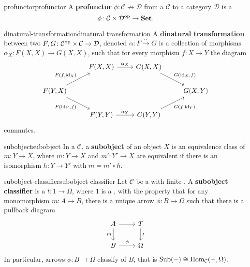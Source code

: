 \begin{topic}{profunctor}{profunctor}
    A \textbf{profunctor} $\phi : \mathcal{C} \nrightarrow \mathcal{D}$ from a  $\mathcal{C}$ to a category $\mathcal{D}$ is a 
    \[ \phi \colon \mathcal{C} \times \mathcal{D}^\textup{op} \to \textbf{Set} . \]
\end{topic}

\begin{topic}{dinatural-transformation}{dinatural transformation}
    A \textbf{dinatural transformation} between two  $F, G \colon \mathcal{C}^\textup{op} \times \mathcal{C} \to \mathcal{D}$, denoted $\alpha \colon F \xrightarrow{\cdot\cdot} G$ is a collection of morphisms $\alpha_X \colon F(X, X) \to G(X, X)$, such that for every morphism $f \colon X \to Y$ the diagram
    \[ \svg \begin{tikzcd} & F(X, X) \arrow{r}{\alpha_X} & G(X, X) \arrow{dr}{G(\id_X, f)} & \\ F(Y, X) \arrow{ur}{F(f, \id_X)} \arrow[swap]{dr}{F(\id_Y, f)} & & & G(X, Y) \\ & F(Y, Y) \arrow{r}{\alpha_Y} & G(Y, Y) \arrow[swap]{ur}{G(f, \id_Y)} & \end{tikzcd} \]
    commutes.
\end{topic}

\begin{topic}{subobject}{subobject}
    In a  $\mathcal{C}$, a \textbf{subobject} of an object $X$ is an equivalence class of  $m \colon Y \to X$, where $m \colon Y \to X$ and $m' \colon Y' \to X$ are equivalent if there is an isomorphism $h \colon Y \to Y'$ with $m = m' \circ h$.
\end{topic}

\begin{topic}{subobject-classifier}{subobject classifier}
    Let $\mathcal{C}$ be a  with finite . A \textbf{subobject classifier} is a  $t \colon 1 \to \Omega$, where $1$ is a , with the property that for any monomorphism $m \colon A \to B$, there is a unique arrow $\phi \colon B \to \Omega$ such that there is a pullback diagram
    \[ \svg \begin{tikzcd} A \arrow[swap]{d}{m} \arrow{r} & T \arrow{d}{t} \\ B \arrow{r}{\phi} & \Omega \end{tikzcd} \]
    In particular, arrows $\phi \colon B \to \Omega$ classify  of $B$, that is $\textup{Sub}(-) \cong \operatorname{Hom}_\mathcal{C}(-, \Omega)$.
\end{topic}

